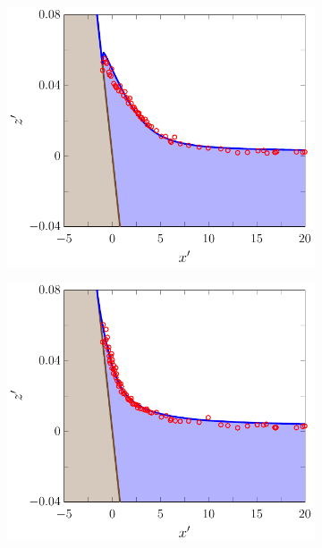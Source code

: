 \begin{figure}
\begin{subfigure}{0.5\textwidth}
		\vspace{0.5cm}
	\end{subfigure}
	\begin{subfigure}{0.5\textwidth}
		\includegraphics[width=\textwidth]{./chp6/figures/Experiment/Synolakis/H0p0185/FDVM/50s.pdf}
		\vspace{0.5cm}
	\end{subfigure}%
	\begin{subfigure}{0.5\textwidth}
		\includegraphics[width=\textwidth]{./chp6/figures/Experiment/Synolakis/H0p0185/FDVM/60s.pdf}

\end{subfigure}
\end{figure}
